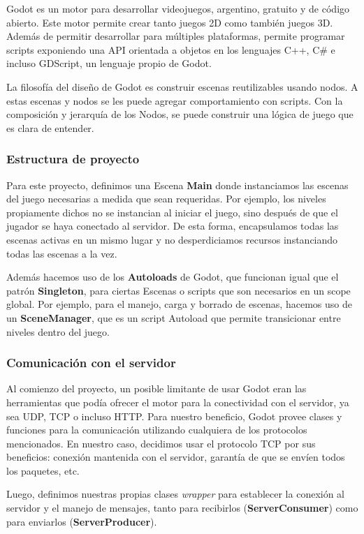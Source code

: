 Godot es un motor para desarrollar videojuegos, argentino, gratuito y de código abierto. Este motor permite crear tanto juegos 2D como también juegos 3D. Además de permitir desarrollar para múltiples plataformas, permite programar scripts exponiendo una API orientada a objetos en los lenguajes C++, C\# e incluso GDScript, un lenguaje propio de Godot.

La filosofía del diseño de Godot es construir escenas reutilizables usando nodos. A estas escenas y nodos se les puede agregar comportamiento con scripts. Con la composición y jerarquía de los Nodos, se puede construir una lógica de juego que es clara de entender.

\subsubsection{Estructura de proyecto}

Para este proyecto, definimos una Escena \textbf{Main} donde instanciamos las escenas del juego necesarias a medida que sean requeridas. Por ejemplo, los niveles propiamente dichos no se instancian al iniciar el juego, sino después de que el jugador se haya conectado al servidor. De esta forma, encapsulamos todas las escenas activas en un mismo lugar y no desperdiciamos recursos instanciando todas las escenas a la vez.

Además hacemos uso de los \textbf{Autoloads} de Godot, que funcionan igual que el patrón \textbf{Singleton}, para ciertas Escenas o scripts que son necesarios en un scope global. Por ejemplo, para el manejo, carga y borrado de escenas, hacemos uso de un \textbf{SceneManager}, que es un script Autoload que permite transicionar entre niveles dentro del juego. 

\subsubsection{Comunicación con el servidor}

Al comienzo del proyecto, un posible limitante de usar Godot eran las herramientas que podía ofrecer el motor para la conectividad con el servidor, ya sea UDP, TCP o incluso HTTP. Para nuestro beneficio, Godot provee clases y funciones para la comunicación utilizando cualquiera de los protocolos mencionados. En nuestro caso, decidimos usar el protocolo TCP por sus beneficios: conexión mantenida con el servidor, garantía de que se envíen todos los paquetes, etc.

Luego, definimos nuestras propias clases \textit{wrapper} para establecer la conexión al servidor y el manejo de mensajes, tanto para recibirlos (\textbf{ServerConsumer}) como para enviarlos (\textbf{ServerProducer}).


